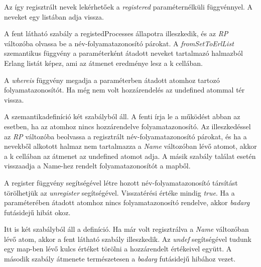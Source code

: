 Az így regisztrált nevek lekérhetőek a \textit{registered} paraméternélküli függvénnyel. A neveket egy listában adja vissza.



A fent látható szabály a registedProcesses állapotra illeszkedik, és az \textit{RP} változóba olvassa be a név-folyamatazonosító párokat. A \textit{fromSetToErlList} szemantikus függvény a paraméterként átadott neveket tartalmazó halmazból Erlang listát képez, ami az átmenet eredménye lesz a k cellában.

A \textit{whereis} függvény megadja a paraméterben átadott atomhoz tartozó folyamatazonosítót. Ha még nem volt hozzárendelés az undefined atommal tér vissza.



A szemantikadefiníció két szabályból áll. A fenti írja le a működést abban az esetben, ha az atomhoz nincs hozzárendelve folyamatazonosító. Az illeszkedéssel az \textit{RP} változóba beolvassa a regisztrált név-folyamatazonosító párokat, és ha a nevekből alkotott halmaz nem tartalmazza a \textit{Name} változóban lévő atomot, akkor a k cellában az átmenet az undefined atomot adja. A másik szabály találat esetén visszaadja a Name-hez rendelt folyamatazonosítót a mapből.

A register függvény segítségével létre hozott név-folyamatazonosító társítást törölhetjük az \textit{unregister} segítségével. Visszatérési értéke mindig \textit{true}. Ha a paraméterében átadott atomhoz nincs folyamatazonosító rendelve, akkor \textit{badarg} futásidejű hibát okoz.



Itt is két szabályból áll a definíció. Ha már volt regisztrálva a \textit{Name} változóban lévő atom, akkor a fent látható szabály illeszkedik. Az \textit{undef} segítségével tudunk egy map-ben lévő kulcs értéket törölni a hozzárendelt értékeivel együtt. A második szabály átmenete természetesen a \textit{badarg} futásidejű hibához vezet.



